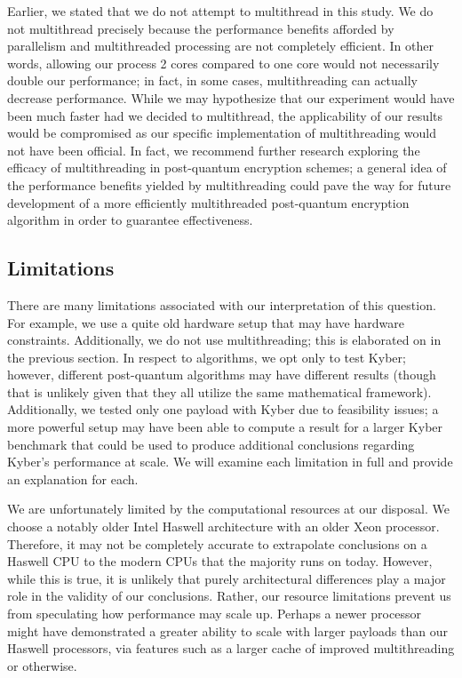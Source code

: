 \documentclass[a4paper]{article}
\begin{document}
Earlier, we stated that we do not attempt to multithread in this study.
We do not multithread precisely because the performance benefits
afforded by parallelism and multithreaded processing are not completely
efficient. In other words, allowing our process 2 cores compared to one
core would not necessarily double our performance; in fact, in some
cases, multithreading can actually decrease performance. While we may
hypothesize that our experiment would have been much faster had we
decided to multithread, the applicability of our results would be
compromised as our specific implementation of multithreading would not
have been official. In fact, we recommend further research exploring the
efficacy of multithreading in post-quantum encryption schemes; a general
idea of the performance benefits yielded by multithreading could pave
the way for future development of a more efficiently multithreaded
post-quantum encryption algorithm in order to guarantee effectiveness.

\subsection{Limitations} There are many limitations associated with our
interpretation of this question. For example, we use a quite old
hardware setup that may have hardware constraints. Additionally, we do
not use multithreading; this is elaborated on in the previous section.
In respect to algorithms, we opt only to test Kyber; however, different
post-quantum algorithms may have different results (though that is
unlikely given that they all utilize the same mathematical framework).
Additionally, we tested only one payload with Kyber due to feasibility
issues; a more powerful setup may have been able to compute a result for
a larger Kyber benchmark that could be used to produce additional
conclusions regarding Kyber's performance at scale. We will examine each
limitation in full and provide an explanation for each.

We are unfortunately limited by the computational resources at our
disposal. We choose a notably older Intel Haswell architecture with an
older Xeon processor. Therefore, it may not be completely accurate to
extrapolate conclusions on a Haswell CPU to the modern CPUs that the
majority runs on today. However, while this is true, it is unlikely that
purely architectural differences play a major role in the validity of
our conclusions. Rather, our resource limitations prevent us from
speculating how performance may scale up. Perhaps a newer processor
might have demonstrated a greater ability to scale with larger payloads
than our Haswell processors, via features such as a larger cache of
improved multithreading or otherwise.
\end{document}
